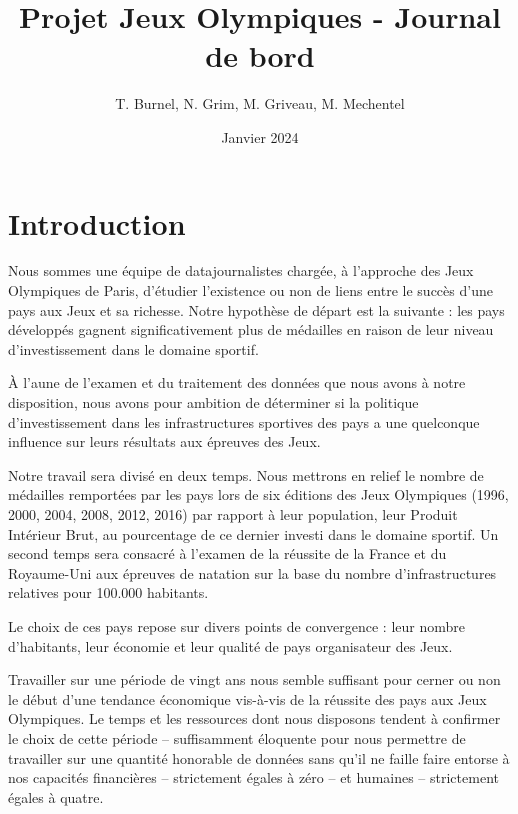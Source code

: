 \documentclass[hidelinks, 12pt]{report}
\title{Projet Jeux Olympiques - Journal de bord}
\date{Janvier 2024}
\author{T. Burnel, N. Grim, M. Griveau, M. Mechentel}
\begin{document}
\maketitle





%




\chapter{Introduction}

Nous sommes une équipe de datajournalistes chargée, à l'approche des Jeux Olympiques de Paris, d'étudier l'existence ou non de liens entre le succès d'une pays aux Jeux et sa richesse. Notre hypothèse de départ est la suivante : les pays développés gagnent significativement plus de médailles en raison de leur niveau d'investissement dans le domaine sportif. 

À l'aune de l'examen et du traitement des données que nous avons à notre disposition, nous avons pour ambition de déterminer si la politique d'investissement dans les infrastructures sportives des pays a une quelconque influence sur leurs résultats aux épreuves des Jeux.

Notre travail sera divisé en deux temps. Nous mettrons en relief le nombre de médailles remportées par les pays lors de six éditions des Jeux Olympiques (1996, 2000, 2004, 2008, 2012, 2016) par rapport à leur population, leur Produit Intérieur Brut, au pourcentage de ce dernier investi dans le domaine sportif. Un second temps sera consacré à l'examen de la réussite de la France et du Royaume-Uni aux épreuves de natation sur la base du nombre d'infrastructures relatives pour 100.000 habitants.

Le choix de ces pays repose sur divers points de convergence : leur nombre d'habitants, leur économie et leur qualité de pays organisateur des Jeux. 

Travailler sur une période de vingt ans nous semble suffisant pour cerner ou non le début d'une tendance économique vis-à-vis de la réussite des pays aux Jeux Olympiques. Le temps et les ressources dont nous disposons tendent à confirmer le choix de cette période -- suffisamment éloquente pour nous permettre de travailler sur une quantité honorable de données sans qu'il ne faille faire entorse à nos capacités financières -- strictement égales à zéro -- et humaines -- strictement égales à quatre.
\end{document}
